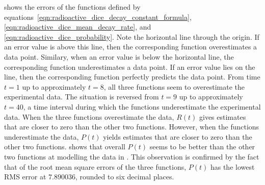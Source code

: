 \documentclass[a4paper,oneside,12pt]{article}
\begin{document}
\begin{problem}
{\begin{solution}
 shows the errors of the functions
defined by
equations~\eqref{eqn:radioactive_dice_decay_constant_formula},
\eqref{eqn:radioactive_dice_mean_decay_rate}, and
\eqref{eqn:radioactive_dice_probability}.  Note the horizontal line
through the origin.  If an error value is above this line, then the
corresponding function overestimates a data point.  Similary, when an
error value is below the horizontal line, the corresponding function
underestimates a data point.  If an error value lies on the line, then
the corresponding function perfectly predicts the data point.  From
time $t = 1$ up to approximately $t = 8$, all three functions seem to
overestimate the experimental data.  The situation is reversed from
$t = 9$ up to approximately $t = 40$, a time interval during which the
functions underestimate the experimental data.  When the three
functions overestimate the data, $R(t)$ gives estimates that are
closer to zero than the other two functions.  However, when the
functions underestimate the data, $P(t)$ yields estimates that are
closer to zero than the other two functions.
 shows that overall $P(t)$ seems
to be better than the other two functions at modelling the data in
.  This observation is confirmed by the
fact that of the root mean square errors of the three functions,
$P(t)$ has the lowest RMS error at $7.890036$, rounded to six decimal
places.
\end{solution}
}{}

\begin{table}[!htbp]
\centering

\caption{%
  The radioactive decay of a sample of $4.0291$ grams of aluminium.
  The sample was neutron activated for $30$ minutes.  Then a Geiger
  counter was used to measure the number of remaining radioactive
  isotopes after the listed numbers of seconds.  The experiment was
  performed by Steven Sahyun of the University of Wisconsin at
  Whitewater, USA on $13$-th January~$2005$.
}
\label{tab:aluminium_radioactive_decay}
\end{table}


\end{problem}
\end{document}
